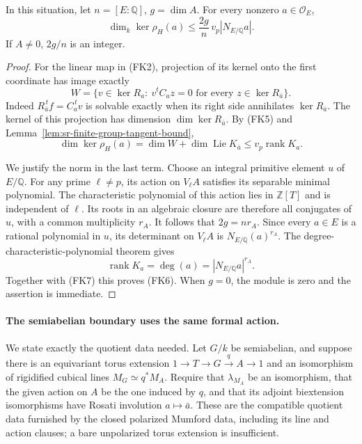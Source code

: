 \begin{srproposition}
\label{prop:sr-proper-formal-kernel-bound}
In this situation, let \(n=[E:\mathbb Q]\), \(g=\dim A\).
For every nonzero \(a\in\mathcal O_E\),
\[
 \dim_k\ker\rho_H(a)
       \le \frac{2g}{n}\,v_p|N_{E/\mathbb Q}a|.
 \tag{FK6}
\]
If \(A\ne0\), \(2g/n\) is an integer.
\end{srproposition}
\begin{proof}
For the linear map in (FK2), projection of its kernel onto
the first coordinate has image exactly
\[
 W=\{v\in\ker R_a:\ v^tC_a z=0
                                  \text{ for every }z\in\ker R_{\bar a}\}.
\]
Indeed \(R_{\bar a}^{\,t}f=C_a^{\,t}v\) is solvable exactly
when its right side annihilates \(\ker R_{\bar a}\).
The kernel of this projection has dimension
\(\dim\ker R_{\bar a}\).
By (FK5) and Lemma~\ref{lem:sr-finite-group-tangent-bound},
\[
 \dim\ker\rho_H(a)=\dim W+\dim\operatorname{Lie}K_{\bar a}
                                   \le v_p\operatorname{rank}K_a.
 \tag{FK7}
\]

We justify the norm in the last term.
Choose an integral primitive element \(u\) of \(E/\mathbb Q\).
For any prime \(\ell\ne p\), its action on \(V_\ell A\)
satisfies its separable minimal polynomial.
The characteristic polynomial of this action lies in
\(\mathbb Z[T]\) and is independent of \(\ell\).
Its roots in an algebraic closure are therefore all conjugates of \(u\),
with a common multiplicity \(r_A\).
It follows that \(2g=n r_A\).
Since every \(a\in E\) is a rational polynomial in \(u\),
its determinant on \(V_\ell A\) is
\(N_{E/\mathbb Q}(a)^{r_A}\).
The degree-characteristic-polynomial theorem gives
\[
                         \operatorname{rank}K_a
                         =\deg(a)=|N_{E/\mathbb Q}a|^{r_A}.
\]
Together with (FK7) this proves (FK6).
When \(g=0\), the module is zero and the assertion is immediate.
\end{proof}

\paragraph{The semiabelian boundary uses the same formal action.}
We state exactly the quotient data needed.
Let \(G/k\) be semiabelian, and suppose there is an equivariant
torus extension
\(1\to T\to G\stackrel q\to A\to1\)
and an isomorphism of rigidified cubical lines
\(M_G\simeq q^*M_A\).
Require that \(\lambda_{M_A}\) be an isomorphism, that the
given action on \(A\) be the one induced by \(q\), and that
its adjoint biextension isomorphisms have Rosati involution
\(a\mapsto\bar a\).
These are the compatible quotient data furnished by the closed
polarized Mumford data, including its line and action clauses;
a bare unpolarized torus extension is insufficient.

